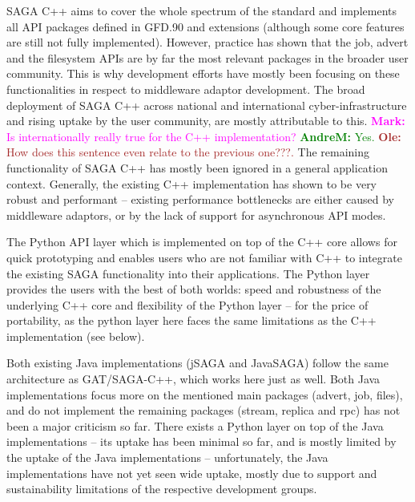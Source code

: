 \documentclass[]{article}
\newcommand{\B}[1]{\textbf{#1}}
\newcommand{\amnote}[1]{{\textcolor{green}{   \B{AndreM:  } #1 }}}
\newcommand{\ownote}[1]{{\textcolor{Brown}{   \B{Ole:     } #1 }}}
\newcommand{\msnote}[1]{{\textcolor{magenta}{ \B{Mark:    } #1 }}}
\newcommand{\amnote}[1]{}
\newcommand{\ownote}[1]{}
\newcommand{\msnote}[1]{}
\begin{document}
  SAGA C++ aims to cover the whole spectrum of the standard and
  implements all API packages defined in GFD.90 and extensions
  (although some core features are still not fully implemented).
  However, practice has shown that the job, advert and the filesystem
  APIs are by far the most relevant packages in the broader user
  community.  This is why development efforts have mostly been
  focusing on these functionalities in respect to middleware adaptor
  development.  The broad deployment of SAGA C++ across national and
  international cyber-infrastructure and rising uptake by the user
  community, are mostly attributable to this. \msnote{Is internationally
  really true for the C++ implementation?}\amnote{Yes.} \ownote{How does this sentence even relate to the previous one???.} The remaining
  functionality of SAGA C++ has mostly been ignored in a general
  application context.  Generally, the existing C++ implementation has
  shown to be very robust and performant -- existing performance
  bottlenecks are either caused by middleware adaptors, or by the lack
  of support for asynchronous API modes.  
  
  The Python API layer which is implemented on top of the C++ core
  allows for quick prototyping and enables users who are not familiar
  with C++ to integrate the existing SAGA functionality into their
  applications.  The Python layer provides the users with the best of
  both worlds: speed and robustness of the underlying C++ core and
  flexibility of the Python layer -- for the price of portability, as
  the python layer here faces the same limitations as the C++
  implementation (see below).

  Both existing Java implementations (jSAGA and JavaSAGA) follow the
  same architecture as GAT/SAGA-C++, which works here just as well.
  Both Java implementations focus more on the mentioned main packages
  (advert, job, files), and do not implement the remaining packages
  (stream, replica and rpc) has not been a major criticism so far.
  There exists a Python layer on top of the Java implementations --
  its uptake has been minimal so far, and is mostly limited by the
  uptake of the Java implementations -- unfortunately, the Java
  implementations have not yet seen wide uptake, mostly due to support
  and sustainability limitations of the respective development groups.
  
\end{document}
